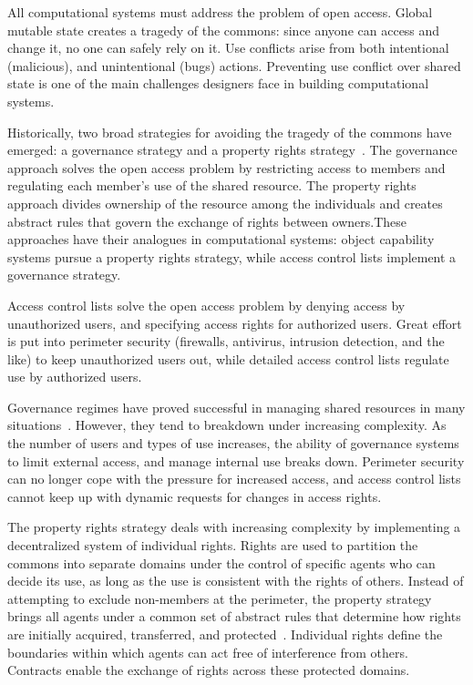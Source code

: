 \documentclass{llncs}
\begin{document}
All computational systems must address the problem of open access. Global mutable state creates a tragedy of the commons: since anyone can access and change it, no one can safely rely on it. Use conflicts arise from both intentional (malicious), and unintentional (bugs) actions. Preventing use conflict over shared state is one of the main challenges designers face in building computational systems.

Historically, two broad strategies for avoiding the tragedy of the commons have emerged: a governance strategy and a property rights strategy~\cite{smith_exclusion_2002}. The governance approach solves the open access problem by restricting access to members and regulating each member's use of the shared resource. The property rights approach divides ownership of the resource among the individuals and creates abstract rules that govern the exchange of rights between owners.These approaches have their analogues in computational systems: object capability systems pursue a property rights strategy, while access control lists implement a governance strategy.

Access control lists solve the open access problem by denying access by unauthorized users, and specifying access rights for authorized users. Great effort is put into perimeter security (firewalls, antivirus, intrusion detection, and the like) to keep unauthorized users out, while detailed access control lists regulate use by authorized users.

Governance regimes have proved successful in managing shared resources in many situations~\cite{ostrom_governing_1990}. However, they tend to breakdown under increasing complexity. As the number of users and types of use increases, the ability of governance systems to limit external access, and manage internal use breaks down. Perimeter security can no longer cope with the pressure for increased access, and access control lists cannot keep up with dynamic requests for changes in access rights.

The property rights strategy deals with increasing complexity by implementing a decentralized system of individual rights. Rights are used to partition the commons into separate domains under the control of specific agents who can decide its use, as long as the use is consistent with the rights of others. Instead of attempting to exclude non-members at the perimeter, the property strategy brings all agents under a common set of abstract rules that determine how rights are initially acquired, transferred, and protected~\cite{hayek_law_1973}. Individual rights define the boundaries within which agents can act free of interference from others. Contracts enable the exchange of rights across these protected domains.  
\end{document}
